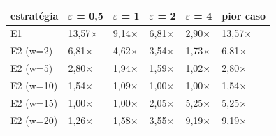 \begin{tabular}{llllll}
\toprule
estratégia & $\varepsilon$ = 0,5 & $\varepsilon$ = 1 & $\varepsilon$ = 2 & $\varepsilon$ = 4 & pior caso \\
\midrule
E1 & 13,57$\times$ & 9,14$\times$ & 6,81$\times$ & 2,90$\times$ & 13,57$\times$ \\
E2 (w=2) & 6,81$\times$ & 4,62$\times$ & 3,54$\times$ & 1,73$\times$ & 6,81$\times$ \\
E2 (w=5) & 2,80$\times$ & 1,94$\times$ & 1,59$\times$ & 1,02$\times$ & 2,80$\times$ \\
E2 (w=10) & 1,54$\times$ & 1,09$\times$ & 1,00$\times$ & 1,00$\times$ & 1,54$\times$ \\
E2 (w=15) & 1,00$\times$ & 1,00$\times$ & 2,05$\times$ & 5,25$\times$ & 5,25$\times$ \\
E2 (w=20) & 1,26$\times$ & 1,58$\times$ & 3,55$\times$ & 9,19$\times$ & 9,19$\times$ \\
\bottomrule
\end{tabular}
